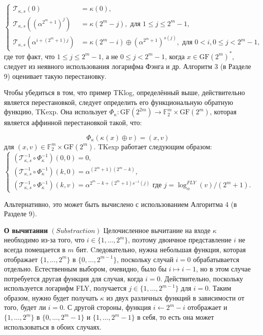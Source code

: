 $$
\begin{cases}
  \mathscr{T}_{\kappa, s}(0) & =\kappa(0), \\
  \mathscr{T}_{\kappa, s}\left(\left(\alpha^{2^m+1}\right)^j\right) & =\kappa\left(2^m-j\right), \text { для } 1 \leq j \leq 2^m-1, \\
  \mathscr{T}_{\kappa, s}\left(\alpha^{i+\left(2^m+1\right) j}\right) & =\kappa\left(2^m-i\right) \oplus\left(\alpha^{2^m+1}\right)^{s(j)}, \text { для } 0<i, 0 \leq j<2^m-1,
\end{cases}
$$ где тот факт, что \(1 \leq j \leq 2^m - 1\), а не \(0 \leq j < 2^m - 1\), когда \(x \in \mathrm{GF}(2^m)^*\), следует из неявного использования логарифма Фэнга и др. Алгоритм 3 (в Разделе 9) оценивает такую перестановку.

Чтобы убедиться в том, что пример TKlog, определённый выше, действительно является перестановкой, следует определить его функциональную обратную функцию, TKexp. Она использует \(\Phi_\kappa: \text{GF}(2^{2m}) \rightarrow \mathbb{F}^m_2 \times \text{GF}(2^m)\), которая является аффинной перестановкой такой, что:

\[
\Phi_\kappa(\kappa(x) \oplus v) = (x, v)
\] для \((x, v) \in \mathbb{F}^m_2 \times \text{GF}(2^m)\). TKexp работает следующим образом:
$$
\left\{\begin{array}{l}
  \left(\mathscr{T}_{\kappa, s}^{-1} \circ \Phi_\kappa^{-1}\right)(0,0)=0, \\
  \left(\mathscr{T}_{\kappa, s}^{-1} \circ \Phi_\kappa^{-1}\right)(k, 0)=\alpha^{\left(2^m+1\right)\left(2^m-k\right)}, \\
  \left(\mathscr{T}_{\kappa, s}^{-1} \circ \Phi_\kappa^{-1}\right)(k, v)=\alpha^{2^m-k+\left(2^m+1\right) s^{-1}(j)} \text { где } j=\log _\alpha^{F L Y}(v) /\left(2^m+1\right) .
  \end{array}\right.
$$

Альтернативно, это может быть вычислено с использованием Алгоритма 4 (в Разделе 9).

\textbf{О вычитании} \((Substraction)\) Целочисленное вычитание на входе \(\kappa\) необходимо из-за того, что \(i \in \{1, \ldots, 2^m\}\), поэтому двоичное представление \(i\) не всегда помещается в \(m\) бит. Cледовательно, нужна небольшая функция, которая отображает \(\{1, \ldots, 2^m\}\) в \(\{0, \ldots, 2^{m - 1}\}\), поскольку случай \(i = 0\) обрабатывается отдельно. Естественным выбором, очевидно, было бы \(i \mapsto i - 1\), но в этом случае потребуется другая функция для случая, когда \(i = 0\). Действительно, поскольку используется логарифм FLY, получается \(j \in \{1, \ldots, 2^{m - 1}\}\) для \(i = 0\). Таким образом, нужно будет получать \(\kappa\) из двух различных функций в зависимости от того, будет ли \(i = 0\). С другой стороны, функция \(i \leftarrow 2^m - i\) отображает и \(\{1, \ldots, 2^m\}\) в \(\{0, \ldots, 2^m - 1\}\) и \(\{1, \ldots, 2^m - 1\}\) в себя, то есть она может использоваться в обоих случаях.

